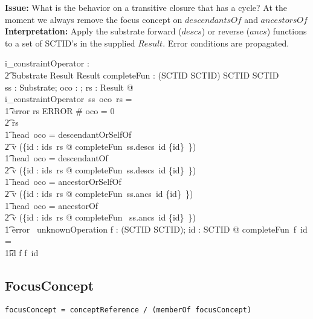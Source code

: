 \documentclass{article}
\begin{document}
\textbf{Issue:} What is the behavior on a transitive closure that has a cycle?  At the moment we always remove the
focus concept on $descendantsOf$ and $ancestorsOf$ \\

\noindent
\textbf{Interpretation:}  Apply the substrate forward ($descs$) or reverse ($ancs$) functions to a set of SCTID's in the supplied
$Result$.  Error conditions are propagated.


\begin{gendef}
   i\_constraintOperator : \\
\t2 Substrate \pfun \optional[constraintOperator] \pfun Result \pfun Result
\also
   completeFun : (SCTID \pfun \power SCTID) \fun SCTID \fun \power SCTID \\
\where
	\forall ss : Substrate; oco : \optional[constraintOperator]; rs : Result @ \\
i\_constraintOperator~ss~oco~rs = \\
\t1 \IF error \inv rs \in ERROR \lor \# oco = 0 \\
\t2 \THEN rs \\
\t1 \ELSE \IF head~oco = descendantOrSelfOf~ \\
\t2 \THEN v (\bigcup \{id : ids~rs @ completeFun~ss.descs~id \cup \{id\}~\}) \\
\t1 \ELSE \IF head~oco = descendantOf~ \\
\t2 \THEN v  (\bigcup \{id : ids~rs @ completeFun~ss.descs~id \setminus \{id\}~\}) \\
\t1 \ELSE \IF head~oco = ancestorOrSelfOf~ \\
\t2 \THEN  v (\bigcup \{id : ids~rs @ completeFun~ss.ancs~id \cup \{id\}~\}) \\
\t1 \ELSE \IF head~oco = ancestorOf~ \\
\t2 \THEN v (\bigcup \{id : ids~rs @ completeFun~ ss.ancs~id \setminus \{id\}~\}) \\
\t1 \ELSE error~ unknownOperation
\also
   \forall f : (SCTID \pfun \power SCTID); id : SCTID @ completeFun~f~id = \\
\t1\IF id \in \dom f \THEN f~id \ELSE \emptyset 
\end{gendef}


\subsection{FocusConcept}

\begin{verbatim}
focusConcept = conceptReference / (memberOf focusConcept)
\end{verbatim}
\end{document}
